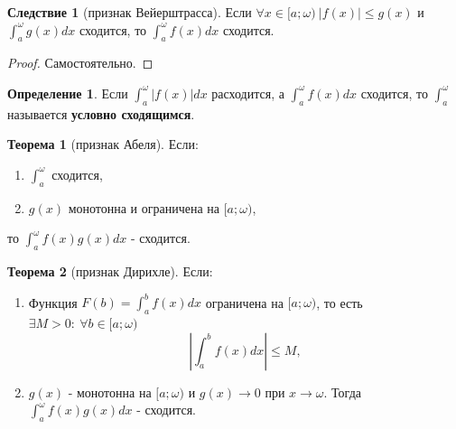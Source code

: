 \documentclass{report}
\theoremstyle{definition}
\newtheorem{definition}{Определение}[section]
\newtheorem*{effect}{Следствие}
\newtheorem{theorem}{Теорема}[section]
\begin{document}
\begin{effect}[признак Вейерштрасса]
  Если $\forall x \in [a;\omega) \ | f(x) | \leqslant g(x)$ и $\int_{a}^{\omega}g(x)dx$ сходится, то
  $\int_{a}^{\omega}f(x)dx$ сходится.
\end{effect}

\begin{proof}
  Самостоятельно.
\end{proof}

\begin{definition}
  Если $\int_{a}^{\omega}| f(x) |dx$ расходится, а $\int_{a}^{\omega}f(x)dx$ сходится, то $\int_{a}^{\omega}$
  называется \textbf{условно сходящимся}.
\end{definition}

\begin{theorem}[признак Абеля]
  Если:
  \begin{enumerate}
    \item $\int_{a}^{\omega}$ сходится,
    \item $g(x)$ монотонна и ограничена на $[a;\omega)$,
  \end{enumerate}
  то $\int_{a}^{\omega} f(x)g(x)dx$ - сходится.
\end{theorem}

\begin{theorem}[признак Дирихле]
  Если:
  \begin{enumerate}
    \item Функция $F(b) = \int_{a}^{b}f(x)dx$ ограничена на $[a;\omega)$, то есть $\exists M > 0: \
            \forall b \in[a;\omega)$
          \begin{equation*}
            | \int_{a}^{b}f(x)dx | \leqslant M,
          \end{equation*}
    \item $g(x)$ - монотонна на $[a;\omega)$ и $g(x)\rightarrow 0$ при $x\rightarrow\omega$.
          Тогда $\int_{a}^{\omega}f(x)g(x)dx$ - сходится.
  \end{enumerate}
\end{theorem}
\end{document}
